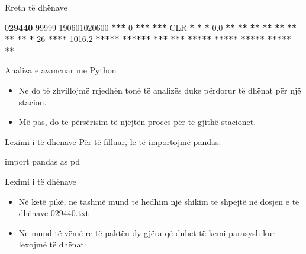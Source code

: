 \documentclass[
  ignorenonframetext,
]{beamer}
\newenvironment{Shaded}{\begin{snugshade}}{\end{snugshade}}
\newcommand{\DecValTok}[1]{\textcolor[rgb]{0.00,0.00,0.81}{#1}}
\newcommand{\ErrorTok}[1]{\textcolor[rgb]{0.64,0.00,0.00}{\textbf{#1}}}
\newcommand{\FloatTok}[1]{\textcolor[rgb]{0.00,0.00,0.81}{#1}}
\newcommand{\ImportTok}[1]{#1}
\newcommand{\NormalTok}[1]{#1}
\newcommand{\OperatorTok}[1]{\textcolor[rgb]{0.81,0.36,0.00}{\textbf{#1}}}
\begin{document}
\begin{frame}[fragile]{Rreth të dhënave}
\begin{Shaded}
\begin{Highlighting}[]
\DecValTok{0}\ErrorTok{29440} \DecValTok{99999} \DecValTok{190601020600} \OperatorTok{***}   \DecValTok{0} \OperatorTok{***} \OperatorTok{***}\NormalTok{ CLR }\OperatorTok{*} \OperatorTok{*} \OperatorTok{*}  \FloatTok{0.0} \OperatorTok{**} \OperatorTok{**} \OperatorTok{**} \OperatorTok{**} \OperatorTok{**} \OperatorTok{**} \OperatorTok{**} \OperatorTok{**} \OperatorTok{*}   \DecValTok{26} \OperatorTok{****} \FloatTok{1016.2} \OperatorTok{*****} \OperatorTok{******} \OperatorTok{***} \OperatorTok{***} \OperatorTok{*****} \OperatorTok{*****} \OperatorTok{*****} \OperatorTok{*****} \OperatorTok{**}
\end{Highlighting}
\end{Shaded}
\end{frame}

\begin{frame}{Analiza e avancuar me Python}
\protect\hypertarget{analiza-e-avancuar-me-python-2}{}
\begin{itemize}
\item
  Ne do të zhvillojmë rrjedhën tonë të analizës duke përdorur të dhënat
  për një stacion.
\item
  Më pas, do të përsërisim të njëjtën proces për të gjithë stacionet.
\end{itemize}
\end{frame}

\begin{frame}[fragile]{Leximi i të dhënave}
\protect\hypertarget{leximi-i-tuxeb-dhuxebnave}{}
Për të filluar, le të importojmë pandas:

\begin{Shaded}
\begin{Highlighting}[]
\ImportTok{import}\NormalTok{ pandas }\ImportTok{as}\NormalTok{ pd}
\end{Highlighting}
\end{Shaded}
\end{frame}

\begin{frame}{Leximi i të dhënave}
\protect\hypertarget{leximi-i-tuxeb-dhuxebnave-1}{}
\begin{itemize}
\item
  Në këtë pikë, ne tashmë mund të hedhim një shikim të shpejtë në dosjen
  e të dhënave 029440.txt
\item
  Ne mund të vëmë re të paktën dy gjëra që duhet të kemi parasysh kur
  lexojmë të dhënat:
\end{itemize}
\end{frame}
\end{document}
